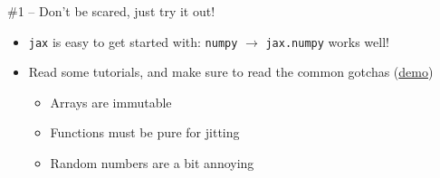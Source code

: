 \documentclass[usenames,dvipsnames,t]{beamer}
\begin{document}
\begin{frame}{\#1 -- Don't be scared, just try it out!}

  \def\x{5mm}

  \begin{itemize}
    \item \texttt{jax} is easy to get started with: \texttt{numpy} $\rightarrow$ \texttt{jax.numpy} works well!
    
    \vspace{\x}

    \item Read some tutorials, and make sure to read the common gotchas (\href{https://github.com/ThibeauWouters/jax-getting-started/blob/main/jax-getting-started.ipynb}{demo})
    
    \begin{itemize}
      \item Arrays are immutable
      
      \vspace{\x}

      \item Functions must be pure for jitting
      
      \vspace{\x}

      \item Random numbers are a bit annoying
    \end{itemize}
  \end{itemize}
  
\end{frame}
\end{document}
